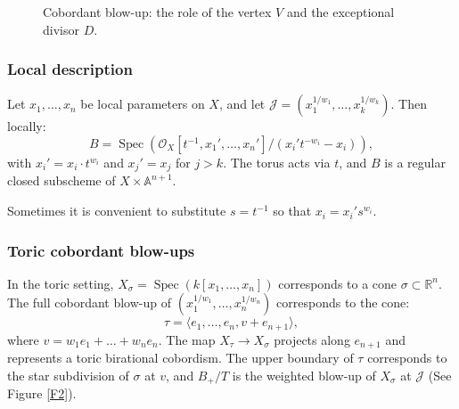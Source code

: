 \documentclass{amsart}
\newcommand{\RR}{{\mathbb{R}}}
\renewcommand{\AA}{{\mathbb{A}}}
\newcommand{\cJ}{{\mathcal J}}
\newcommand{\cO}{{\mathcal O}}
\newcommand{\Spec}{\operatorname{Spec}}
\renewcommand{\setminus}{\smallsetminus}
\begin{document}
\begin{figure}[ht]
\caption{Cobordant blow-up: the role of the vertex $V$ and the exceptional divisor $D$.}\label{F1}
\label{fig:cobordant-blowup}
\end{figure}


\subsubsection{Local description}

Let $x_1, \ldots, x_n$ be local parameters on $X$, and let $\cJ = (x_1^{1/w_1}, \ldots, x_k^{1/w_k})$. Then locally:
\[
B = \Spec\left( \cO_X[t^{-1}, x_1', \ldots, x_n'] / (x_i' t^{-w_i} - x_i) \right),
\]
with $x_i' = x_i \cdot t^{w_i}$ and $x_j' = x_j$ for $j > k$. The torus acts via $t$, and $B$ is a regular closed subscheme of $X \times \AA^{n+1}$.

\begin{remark}
Sometimes it is convenient to substitute $s = t^{-1}$ so that $x_i = x_i' s^{w_i}$.
\end{remark}

\subsubsection{Toric cobordant blow-ups}

In the toric setting, $X_\sigma = \Spec(k[x_1,\ldots,x_n])$ corresponds to a cone $\sigma \subset \RR^n$. The full cobordant blow-up of $(x_1^{1/w_1}, \ldots, x_n^{1/w_n})$ corresponds to the cone:
\[
\tau = \langle e_1, \ldots, e_n, v + e_{n+1} \rangle,
\]
where $v = w_1 e_1 + \ldots + w_n e_n$. The map $X_\tau \to X_\sigma$ projects along $e_{n+1}$ and represents a toric birational cobordism. The upper boundary of $\tau$ corresponds to the star subdivision of $\sigma$ at $v$, and $B_+ / T$ is the weighted blow-up of $X_\sigma$ at $\cJ$ (See Figure \ref{F2}).
\end{document}
